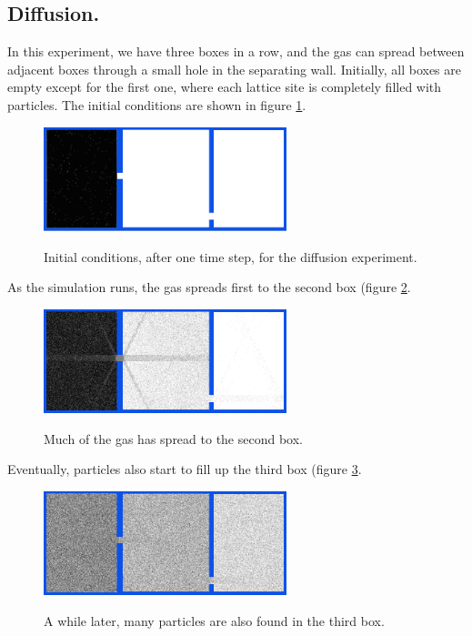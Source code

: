\documentclass[12pt,a4paper]{article}
\begin{document}
\subsection{Diffusion.}
In this experiment, we have three boxes in a row, and the gas can spread between adjacent boxes through a small
hole in the separating wall. Initially, all boxes are empty except for the first one, where each lattice site
is completely filled with particles. The initial conditions are shown in figure \ref{diffusioninit}.

\begin{figure}[htp]
\caption{Initial conditions, after one time step, for the diffusion experiment.}
\centering
  \includegraphics[width=200pt]{figs/diffusioninit.png}
\label{diffusioninit}
\end{figure}

As the simulation runs, the gas spreads first to the second box (figure \ref{diffusionbox2fill}.
\begin{figure}[htp]
\caption{Much of the gas has spread to the second box.}
\centering
  \includegraphics[width=200pt]{figs/diffusionbox2fill.png}
\label{diffusionbox2fill}
\end{figure}

Eventually, particles also start to fill up the third box (figure \ref{diffusionbox3fill}.
\begin{figure}[htp]
\caption{A while later, many particles are also found in the third box.}
\centering
  \includegraphics[width=200pt]{figs/diffusionbox3fill.png}
\label{diffusionbox3fill}
\end{figure}
\end{document}
